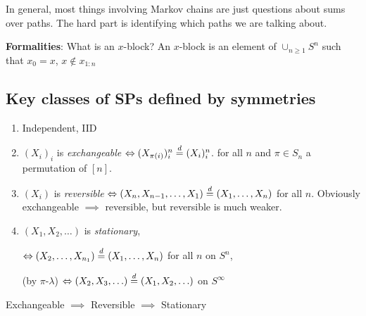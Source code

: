 In general, most things involving Markov chains are just questions about
sums over paths. The hard part is identifying which paths we are talking about.

\textbf{Formalities}: What is an $x$-block? An $x$-block is an element of
$\cup_{n \geq 1} S^n$ such that $x_0 = x$, $x \not \in x_{1:n}$

\subsection{Key classes of SPs defined by symmetries}

\begin{enumerate}
  \item Independent, IID
  \item $(X_i)_{i}$ is \emph{exchangeable} $\Leftrightarrow (X_{\pi(i)})^n_i \overset{d}{=} (X_i)^n_i$.
    for all $n$ and $\pi \in S_n$ a permutation of $[n]$.
  \item $(X_i)$ is \emph{reversible}
    $\Leftrightarrow (X_n, X_{n-1}, \ldots, X_1) \overset{d}{=} (X_1, \ldots, X_n)$ for all $n$. Obviously exchangeable $\implies$ reversible, but reversible is much weaker.
  \item $(X_1, X_2, \ldots)$ is \emph{stationary},

    $\Leftrightarrow (X_2, \ldots, X_{n_1}) \overset{d}{=} (X_1, \ldots, X_n)$ for all $n$ on $S^n$,

    (by $\pi$-$\lambda$) $\Leftrightarrow (X_2, X_3, \ldots) \overset{d}{=} (X_1, X_2, \ldots)$ on $S^\infty$
\end{enumerate}

\begin{exercise}
  Exchangeable $\implies$ Reversible $\implies$ Stationary
\end{exercise}
